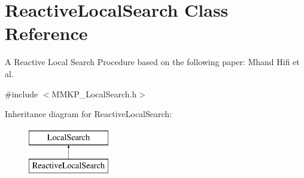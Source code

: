 \hypertarget{class_reactive_local_search}{\section{Reactive\+Local\+Search Class Reference}
\label{class_reactive_local_search}
}


A Reactive Local Search Procedure based on the following paper\+: Mhand Hifi et al.  




{\ttfamily \#include $<$M\+M\+K\+P\+\_\+\+Local\+Search.\+h$>$}

Inheritance diagram for Reactive\+Local\+Search\+:\begin{figure}[H]
\begin{center}
\leavevmode
\includegraphics[height=2.000000cm]{class_reactive_local_search}
\end{center}
\end{figure}
